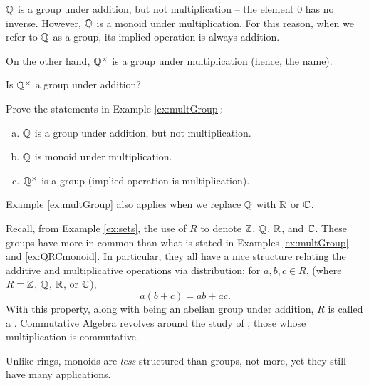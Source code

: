 \documentclass[../UNABRIDGEDalgebraNotesMSRI-UP2016.tex]{subfiles}
\begin{document}
\begin{frame}
\begin{ex}\label{ex:multGroup}
$\mathbb Q$ is a group under addition, but not multiplication -- the element $0$ has no inverse.  However, $\mathbb Q$ is a monoid under multiplication.  For this reason, when we refer to $\mathbb Q$ as a group, its implied operation is always addition.

\smallGap
On the other hand, $\mathbb Q^{\times}$ is a group under multiplication (hence, the name).  
\end{ex}

\begin{que}
Is $\mathbb Q^{\times}$ a group under addition?
\end{que}

\begin{exe}\label{exe:Zmonoid}
Prove the statements in Example \ref{ex:multGroup}:
\begin{enumerate}[(a)]
\item $\mathbb Q$ is a group under addition, but not multiplication.
\item $\mathbb Q$ is monoid under multiplication.
\item $\mathbb Q^{\times}$ is a group (implied operation is multiplication).
\end{enumerate}
\end{exe}
\end{frame}

\begin{frame}{}{}
\begin{ex}\label{ex:QRCmonoid}
Example \ref{ex:multGroup} also applies when we replace $\mathbb Q$ with $\mathbb R$ or $\mathbb C$.
\end{ex}

\smallGap
Recall, from Example \ref{ex:sets}, the use of $R$ to denote $\mathbb Z$, $\mathbb Q$, $\mathbb R$, and $\mathbb C$.  These groups have more in common than what is stated in Examples \ref{ex:multGroup} and \ref{ex:QRCmonoid}.  In particular, they all have a nice structure relating the additive and multiplicative operations via distribution; for $a,b,c\in R$, (where $R=\mathbb Z$, $\mathbb Q$, $\mathbb R$, or $\mathbb C$),
\[
a(b+c)=ab+ac.
\]
With this property, along with being an abelian group under addition, $R$ is called a .  Commutative Algebra revolves around the study of , those whose multiplication is commutative.  

\smallGap
Unlike rings, monoids are \emph{less} structured than groups, not more, yet they still have many applications.  
\end{frame}
\end{document}
